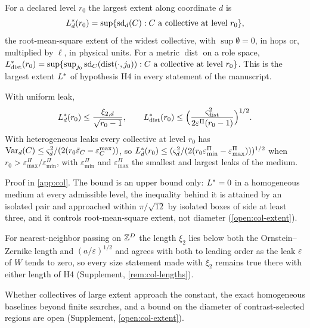 \begin{definition}\label{def:col-lstar}
For a declared level $r_0$ the largest extent along coordinate $d$ is
\begin{equation}\label{eq:col-lstar-def}
L^{\ast}_d(r_0)=\sup\{\operatorname{sd}_d(C):C\text{ a collective at level }r_0\},
\end{equation}
the root-mean-square extent of the widest collective, with $\sup\emptyset=0$, in hops or, multiplied by $\ell$, in physical units. For a metric $\operatorname{dist}$ on a role space, $L^{\ast}_{\mathrm{dist}}(r_0)=\sup\{\sup_{j_0}\operatorname{sd}_C(\operatorname{dist}(\cdot,j_0)):C\text{ a collective at level }r_0\}$. This is the largest extent $L^{\ast}$ of hypothesis H4 in every statement of the manuscript.
\end{definition}

\begin{corollary}\label{cor:col-lstar}
With uniform leak,
\begin{equation}\label{eq:col-lstar}
L^{\ast}_d(r_0)\le\frac{\xi_{2,d}}{\sqrt{r_0-1}},\qquad L^{\ast}_{\mathrm{dist}}(r_0)\le\Bigl(\frac{\varsigma_{\mathrm{dist}}^2}{2\varepsilon^\Pi(r_0-1)}\Bigr)^{1/2}.
\end{equation}
With heterogeneous leaks every collective at level $r_0$ has $\operatorname{Var}_d(C)\le\varsigma_d^2/(2(r_0\bar\varepsilon_C-\varepsilon^{\max}_C))$, so $L^{\ast}_d(r_0)\le(\varsigma_d^2/(2(r_0\varepsilon^\Pi_{\min}-\varepsilon^\Pi_{\max})))^{1/2}$ when $r_0>\varepsilon^\Pi_{\max}/\varepsilon^\Pi_{\min}$, with $\varepsilon^\Pi_{\min}$ and $\varepsilon^\Pi_{\max}$ the smallest and largest leaks of the medium.
\end{corollary}
Proof in \cref{app:col}. The bound is an upper bound only: $L^{\ast}=0$ in a homogeneous medium at every admissible level, the inequality behind it is attained by an isolated pair and approached within $\pi/\sqrt{12}$ by isolated boxes of side at least three, and it controls root-mean-square extent, not diameter (\cref{open:col-extent}).

For nearest-neighbor passing on $\mathbb{Z}^D$ the length $\xi_2$ lies below both the Ornstein--Zernike length and $(a/\varepsilon)^{1/2}$ and agrees with both to leading order as the leak $\varepsilon$ of $W$ tends to zero, so every size statement made with $\xi_2$ remains true there with either length of H4 (Supplement, \cref{rem:col-lengths}).

Whether collectives of large extent approach the constant, the exact homogeneous baselines beyond finite searches, and a bound on the diameter of contrast-selected regions are open (Supplement, \cref{open:col-extent}).

